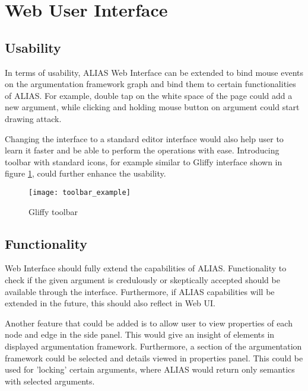 \section{Web User Interface}

\subsection{Usability}
In terms of usability, ALIAS Web Interface can be extended to bind mouse events on the argumentation framework graph and bind them to certain functionalities of ALIAS. For example, double tap on the white space of the page could add a new argument, while clicking and holding mouse button on argument could start drawing attack. 

Changing the interface to a standard editor interface would also help user to learn it faster and be able to perform the operations with ease. Introducing toolbar with standard icons, for example similar to Gliffy interface shown in figure \ref{fig:toolbarExample}, could further enhance the usability.

\begin{figure}
	\texttt{[image: toolbar\_example]}
	\caption{Gliffy toolbar}
	\label{fig:toolbarExample}
\end{figure}

\subsection{Functionality}
Web Interface should fully extend the capabilities of ALIAS. Functionality to check if the given argument is credulously or skeptically accepted should be available through the interface. Furthermore, if ALIAS capabilities will be extended in the future, this should also reflect in Web UI.

Another feature that could be added is to allow user to view properties of each node and edge in the side panel. This would give an insight of elements in displayed argumentation framework. Furthermore, a section of the argumentation framework could be selected and details viewed in properties panel. This could be used for 'locking' certain arguments, where ALIAS would return only semantics with selected arguments.

